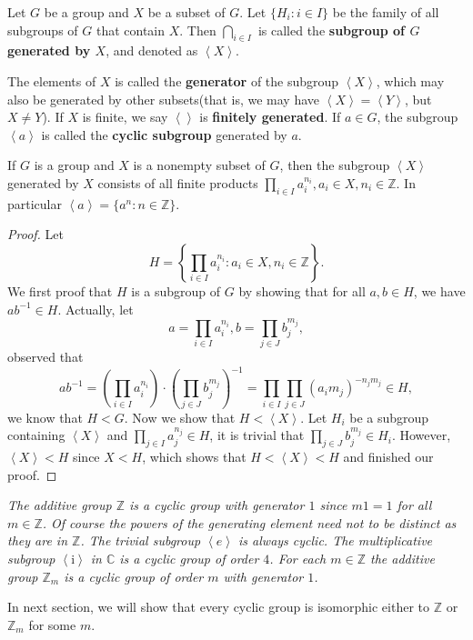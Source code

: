 \begin{definition}
Let $G$ be a group and $X$ be a subset of $G$. Let $\{H_i:i\in I\}$ be the family of all subgroups of $G$ that contain $X$. Then $\bigcap_{i\in I}$ is called the \textbf{subgroup of $G$ generated by $X$}, and denoted as $\left<X\right>$. 
\end{definition}
The elements of $X$ is called the \textbf{generator} of the subgroup $\left<X\right>$, which may also be generated by other subsets(that is, we may have $\left<X\right>=\left<Y\right>$, but $X\ne Y$). If $X$ is finite, we say $\left<\right>$ is \textbf{finitely generated}. If $a\in G$, the subgroup $\left<a\right>$ is called the \textbf{cyclic subgroup} generated by $a$.
\begin{theorem}
If $G$ is a group and $X$ is a nonempty subset of $G$, then the subgroup $\left<X\right>$ generated by $X$ consists of all finite products $\prod_{i\in I}a_i^{n_i},a_i\in X,n_i\in\mathbb{Z}$. In particular $\left<a\right>=\{a^n:n\in\mathbb{Z}\}$.
\end{theorem}
\begin{proof}
Let 
$$
H=\left\{ \prod_{i\in I}{a_{i}^{n_i}}:a_i\in X,n_i\in \mathbb{Z} \right\} .
$$
We first proof that $H$ is a subgroup of $G$ by showing that for all $a,b\in H$, we have $ab^{-1}\in H$. Actually, let 
$$
a=\prod_{i\in I}{a_{i}^{n_i}},b=\prod_{j\in J}{b_{j}^{m_j}},
$$
observed that
$$
ab^{-1}=\left( \prod_{i\in I}{a_{i}^{n_i}} \right) \cdot \left( \prod_{j\in J}{b_{j}^{m_j}} \right) ^{-1}=\prod_{i\in I}{\prod_{j\in J}{\left( a_im_j \right) ^{-n_jm_j}}}\in H,
$$
we know that $H<G$. Now we show that $H<\left<X\right>$. Let $H_i$ be a subgroup containing $\left<X\right>$ and $\prod_{j\in I}{a_{j}^{n_j}}\in H$, it is trivial that $\prod_{j\in J}{b_{j}^{m_j}}\in H_i$. However, $\left<X\right><H$ since $X<H$, which shows that $H<\left<X\right><H$ and finished our proof.
\end{proof}
\begin{example}\em
The additive group $\mathbb{Z}$ is a cyclic group with generator $1$ since $m1=1$ for all $m\in\mathbb{Z}$. Of course the powers of the generating element need not to be distinct as they are in $\mathbb{Z}$. The trivial subgroup $\left<e\right>$ is always cyclic. The multiplicative subgroup $\left<\mathrm{i}\right>$ in $\mathbb{C}$ is a cyclic group of order $4$. For each $m\in\mathbb{Z}$ the additive group $\mathbb{Z}_m$ is a cyclic group of order $m$ with generator $1$.
\end{example}
In next section, we will show that every cyclic group is isomorphic either to $\mathbb{Z}$ or $\mathbb{Z}_m$ for some $m$.\par
